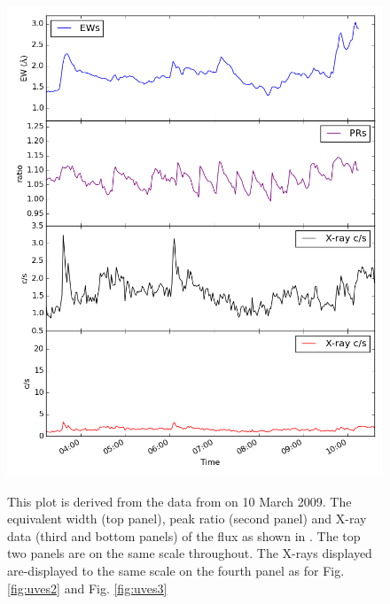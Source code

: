 \begin{figure}[!htbp]
\centering
\includegraphics[scale=0.30]{Figures/uves1.png} \\
\caption{This plot is derived from the data from {\uves} on 10 March 2009.
  The equivalent width (top panel), peak ratio (second panel) and X-ray data (third and bottom panels) of the
  {\ha} flux as shown in \citet[Fig. 1]{fuhrmeister11}. The top two panels are on the same scale
  throughout. The X-rays displayed are-displayed to the same scale on the fourth panel as for Fig. \ref{fig:uves2} and
  Fig. \ref{fig:uves3}}
 \protect\label{fig:uves1}
\end{figure}
